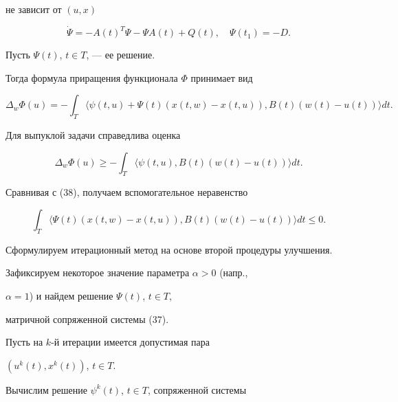 не зависит от $(u, x)$


\begin{equation}


\Dot{\Psi}=- A(t)^{T} \Psi - \Psi A(t)+Q(t),\quad \Psi(t_{1})=- D.


\end{equation}





Пусть $\Psi(t)$, $t \in T$, --- ее решение. 


Тогда формула приращения функционала $\Phi$ принимает вид


\begin{equation}


\Delta_{w} \Phi(u)=- \int_{T} \langle \psi(t, u)+\Psi(t)(x(t, w) -


x(t, u)), B(t)(w(t) - u(t))\rangle dt.


\end{equation}


Для выпуклой задачи справедлива оценка 


$$


\Delta_{w} \Phi(u) \geq - \int_{T} \langle \psi(t, u),


B(t)(w(t) - u(t))\rangle dt.


$$


Сравнивая с (38), получаем вспомогательное неравенство


\begin{equation}


\int_{T}\langle\Psi(t)(x(t,w)-x(t, u)),B(t)(w(t)-u(t))\rangle dt\le 0.


\end{equation}





Сформулируем итерационный метод на основе второй процедуры улучшения.





Зафиксируем некоторое значение параметра $\alpha>0$ (напр.,


$\alpha=1$) и найдем решение $\Psi(t)$, $t \in T$,


матричной сопряженной системы (37).





Пусть на $k$-й итерации имеется допустимая пара


$(u^{k}(t), x^{k}(t))$, $t \in T$.


Вычислим решение $\psi^{k}(t)$, $t \in T$, сопряженной системы


